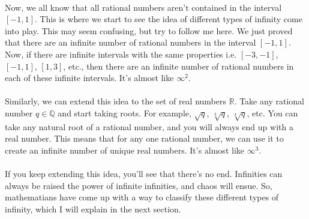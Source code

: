 \\
Now, we all know that all rational numbers aren't contained in the interval $[-1,1]$. This is where we start to see the idea of different types of infinity come into play. This may seem confusing, but try to follow me here. We just proved that there are an infinite number of rational numbers in the interval $[-1, 1]$. Now, if there are infinite intervals with the same properties i.e. $[-3, -1]$, $[-1, 1]$, $[1, 3]$, etc., then there are an infinite number of rational numbers in each of these infinite intervals. It's almost like $\infty^2$. \\
\\
Similarly, we can extend this idea to the set of real numbers $\mathbb{R}$. Take any rational number $q \in \mathbb{Q}$ and start taking roots. For example, $\sqrt{q}$, $\sqrt[3]{q}$, $\sqrt[4]{q}$, etc. You can take any natural root of a rational number, and you will always end up with a real number. This means that for any one rational number, we can use it to create an infinite number of unique real numbers. It's almost like $\infty^3$. \\
\\
If you keep extending this idea, you'll see that there's no end. Infinities can always be raised the power of infinite infinities, and chaos will ensue. So, mathematians have come up with a way to classify these different types of infinity, which I will explain in the next section.
